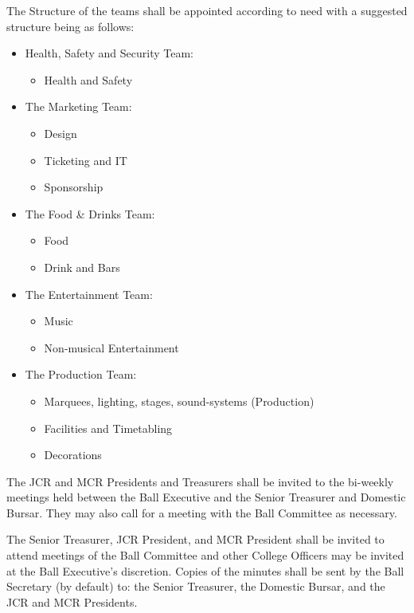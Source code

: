 \appnpara The Structure of the teams shall be appointed according to need with a suggested structure being as follows:
\begin{itemize}
    \item Health, Safety and Security Team: 
    \begin{itemize}
        \item Health and Safety
    \end{itemize}
    \item The Marketing Team:
    \begin{itemize}
        \item Design
        \item Ticketing and IT
        \item Sponsorship
    \end{itemize}
    \item The Food \& Drinks Team:
    \begin{itemize}
        \item Food
        \item Drink and Bars
    \end{itemize}
    \item The Entertainment Team:
    \begin{itemize}
        \item Music
        \item Non-musical Entertainment
    \end{itemize}
    \item The Production Team:
    \begin{itemize}
        \item Marquees, lighting, stages, sound-systems (Production)
        \item Facilities and Timetabling
        \item Decorations
    \end{itemize}
\end{itemize}

\appnpara The JCR and MCR Presidents and Treasurers shall be invited to the bi-weekly meetings held between the Ball Executive and the Senior Treasurer and Domestic Bursar. They may also call for a meeting with the Ball Committee as necessary.

\appnpara The Senior Treasurer, JCR President, and MCR President shall be invited to attend meetings of the Ball Committee and other College Officers may be invited at the Ball Executive’s discretion. Copies of the minutes shall be sent by the Ball Secretary (by default) to: the Senior Treasurer, the Domestic Bursar, and the JCR and MCR Presidents.  


